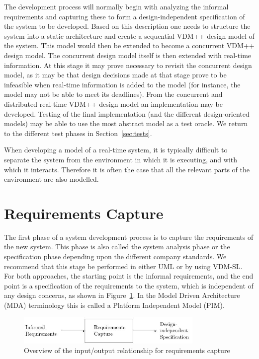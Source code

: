 \documentclass{overturerepchap}
\begin{document}
The development process will normally begin with analyzing the
informal requirements and capturing these to form a design-independent
specification of the system to be developed. Based on this description
one needs to structure the system into a static architecture and
create a sequential VDM++ design model of the system. This model would
then be extended to become a concurrent VDM++ design model. The
concurrent design model itself is then extended with real-time
information. At this stage it may prove necessary to revisit the
concurrent design model, as it may be that design decisions made at
that stage prove to be infeasible when real-time information is added
to the model (for instance, the model may not be able to meet its
deadlines). From the concurrent and distributed real-time VDM++ design
model an implementation may be developed.  Testing of the final
implementation (and the different design-oriented models) may be able
to use the most abstract model as a test oracle. We return to the
different test phases in Section~\ref{sec:tests}.

When developing a model of a real-time system, it is typically
difficult to separate the system from the environment in which it is
executing, and with which it interacts.  Therefore it is often the
case that all the relevant parts of the environment are also modelled.

\section{Requirements Capture}

The first phase of a system development process is to capture the
requirements of the new system. This phase is also called the system
analysis phase or the specification phase depending upon the different
company standards. We recommend that this stage be performed in either
UML or by using VDM-SL. For both approaches, the starting point is the
informal requirements, and the end point is a specification of the
requirements to the system, which is independent of any design
concerns, as shown in Figure~\ref{fig:inputoutput}. In the Model
Driven Architecture (MDA) \cite{MDA} terminology this is called a
Platform Independent Model (PIM).

\begin{figure}
\begin{center}
\includegraphics[width=0.8\textwidth]{figures/reqcapture.jpg}
\end{center}
\caption{Overview of the input/output relationship for requirements capture}\label{fig:inputoutput}
\end{figure}
\end{document}
